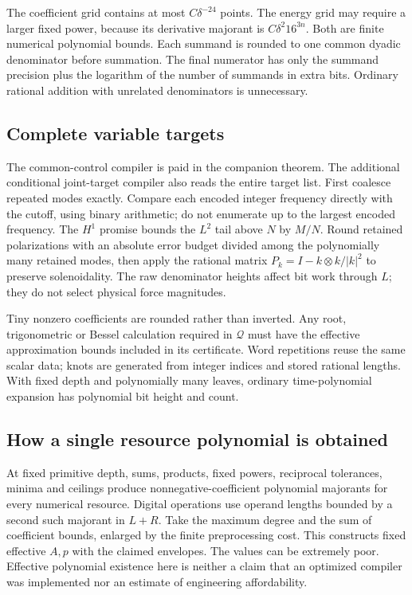 \documentclass[11pt,a4paper]{amsart}
\theoremstyle{definition}
\theoremstyle{remark}
\numberwithin{equation}{section}
\newcommand{\Qcal}{\mathcal Q}
\begin{document}
The coefficient grid contains at most $C\delta^{-24}$ points. The energy grid may require a larger fixed power, because its derivative majorant is $C\delta^2 16^{3n}$. Both are finite numerical polynomial bounds. Each summand is rounded to one common dyadic denominator before summation. The final numerator has only the summand precision plus the logarithm of the number of summands in extra bits. Ordinary rational addition with unrelated denominators is unnecessary.

\subsection{Complete variable targets}
The common-control compiler is paid in the companion theorem. The additional conditional joint-target compiler also reads the entire target list. First coalesce repeated modes exactly. Compare each encoded integer frequency directly with the cutoff, using binary arithmetic; do not enumerate up to the largest encoded frequency. The $H^1$ promise bounds the $L^2$ tail above $N$ by $M/N$. Round retained polarizations with an absolute error budget divided among the polynomially many retained modes, then apply the rational matrix
$P_k=I-k\otimes k/|k|^2$ to preserve solenoidality. The raw denominator heights affect bit work through $L$; they do not select physical force magnitudes.

Tiny nonzero coefficients are rounded rather than inverted. Any root, trigonometric or Bessel calculation required in $\Qcal$ must have the effective approximation bounds included in its certificate. Word repetitions reuse the same scalar data; knots are generated from integer indices and stored rational lengths. With fixed depth and polynomially many leaves, ordinary time-polynomial expansion has polynomial bit height and count.

\subsection{How a single resource polynomial is obtained}
At fixed primitive depth, sums, products, fixed powers, reciprocal tolerances, minima and ceilings produce nonnegative-coefficient polynomial majorants for every numerical resource. Digital operations use operand lengths bounded by a second such majorant in $L+R$. Take the maximum degree and the sum of coefficient bounds, enlarged by the finite preprocessing cost. This constructs fixed effective $A,p$ with the claimed envelopes. The values can be extremely poor. Effective polynomial existence here is neither a claim that an optimized compiler was implemented nor an estimate of engineering affordability.
\end{document}
